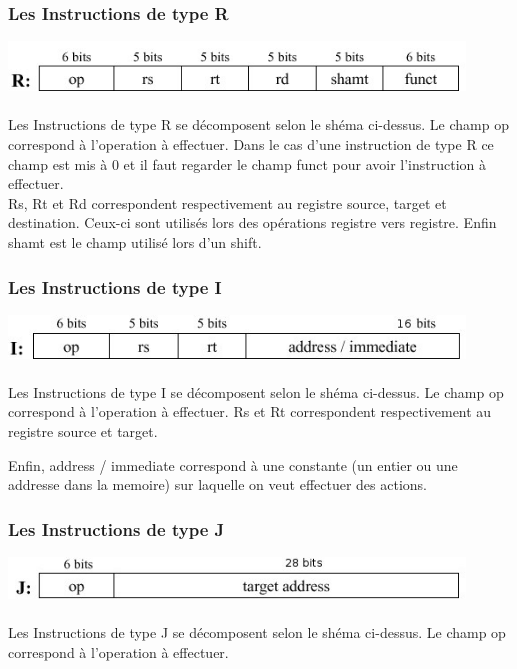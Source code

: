 \subsubsection{Les Instructions de type R}

\includegraphics[width = 12.11cm]{R-type.jpg}
~ \\ ~ \\
Les Instructions de type R se décomposent selon le shéma ci-dessus.
Le champ op correspond à l'operation à effectuer. Dans le cas d'une instruction de type R ce champ est mis à 0 et il faut regarder le champ funct pour avoir l'instruction à effectuer.\\

Rs, Rt et Rd correspondent respectivement au registre source, target et destination. Ceux-ci sont utilisés lors des opérations registre vers registre. Enfin shamt est le champ utilisé lors d'un shift.

\subsubsection{Les Instructions de type I}

\includegraphics[width = 12.11cm]{I-type.jpg}
~ \\ ~ \\
Les Instructions de type I se décomposent selon le shéma ci-dessus. Le champ op correspond à l'operation à effectuer. Rs et Rt correspondent respectivement au registre source et target.

Enfin, address / immediate correspond à une constante (un entier ou une addresse dans la memoire) sur laquelle on veut effectuer des actions.

\subsubsection{Les Instructions de type J}

\includegraphics[width = 12.11cm]{J-type.jpg}
~ \\ ~ \\
Les Instructions de type J se décomposent selon le shéma ci-dessus. Le champ op correspond à l'operation à effectuer.

